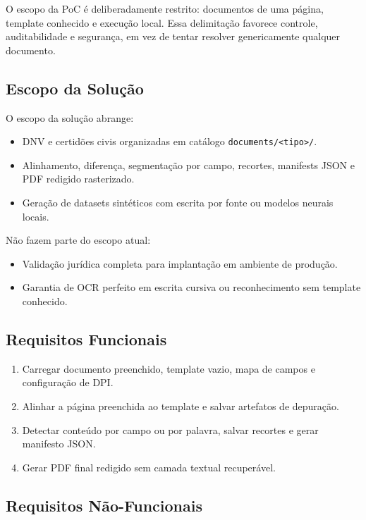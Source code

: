 \documentclass[12pt,a4paper]{article}
\begin{document}
O escopo da PoC é deliberadamente restrito: documentos de uma página, template conhecido e execução local. Essa delimitação favorece controle, auditabilidade e segurança, em vez de tentar resolver genericamente qualquer documento.

\subsection{Escopo da Solução}

O escopo da solução abrange:
\begin{itemize}
    \item{} DNV e certidões civis organizadas em catálogo \texttt{documents/<tipo>/}.
    \item{} Alinhamento, diferença, segmentação por campo, recortes, manifests JSON e PDF redigido rasterizado.
    \item{} Geração de datasets sintéticos com escrita por fonte ou modelos neurais locais.
\end{itemize}

Não fazem parte do escopo atual:
\begin{itemize}
    \item{} Validação jurídica completa para implantação em ambiente de produção.
    \item{} Garantia de OCR perfeito em escrita cursiva ou reconhecimento sem template conhecido.
\end{itemize}

\subsection{Requisitos Funcionais}

\begin{enumerate}
    \item{} Carregar documento preenchido, template vazio, mapa de campos e configuração de DPI.
    \item{} Alinhar a página preenchida ao template e salvar artefatos de depuração.
    \item{} Detectar conteúdo por campo ou por palavra, salvar recortes e gerar manifesto JSON.
    \item{} Gerar PDF final redigido sem camada textual recuperável.
\end{enumerate}

\subsection{Requisitos Não-Funcionais}
\end{document}
